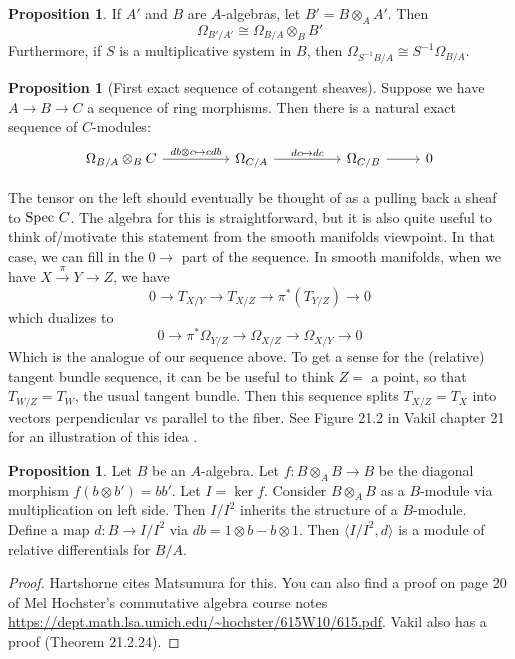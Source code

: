 \documentclass[10pt,reqno]{amsart}
\theoremstyle{definition}
\newtheorem{proposition}[theorem]{Proposition}
\theoremstyle{remark}
\numberwithin{equation}{section}
\numberwithin{theorem}{section}
\newcommand*{\red}{\textcolor{red}}
\newcommand{\spec}{\textup{Spec }}
\begin{document}
\begin{proposition}\label{prop:differentials-base-change} If $A'$ and $B$ are $A$-algebras, let $B' = B \otimes_A A'$. Then 
\[\Omega_{B'/A'} \cong \Omega_{B/A} \otimes_B B'\]
Furthermore, if $S$ is a multiplicative system in $B$, then $\Omega_{S^{-1}B/A} \cong S^{-1}\Omega_{B/A}$.
\end{proposition}


\begin{proposition}[First exact sequence of cotangent sheaves]\label{prop:differentials-two-maps-seq} Suppose we have $A \to B \to C$ a sequence of ring morphisms. Then there is a natural exact sequence of $C$-modules:
\[\begin{tikzcd}
\Omega_{B/A} \otimes_B C \arrow[rr," db \otimes c  \mapsto cdb"] & & \Omega_{C/A} \arrow[rr,"dc \mapsto dc"]& &\Omega_{C/B} \arrow[r]& 0
\end{tikzcd}\]
\end{proposition}

The tensor on the left should eventually be thought of as a pulling back a sheaf to $\spec C$. The algebra for this is straightforward, but it is also quite useful to think of/motivate this statement from the smooth manifolds viewpoint. In that case, we can fill in the $0 \to $ part of the sequence. In smooth manifolds, when we have $X \stackrel{\pi}{\to} Y \to Z$, we have
\[0 \to T_{X/Y} \to T_{X/Z} \to \pi^*(T_{Y/Z}) \to 0\]
which dualizes to
\[0 \to \pi^*\Omega_{Y/Z} \to \Omega_{X/Z} \to \Omega_{X/Y} \to 0\]
Which is the analogue of our sequence above. To get a sense for the (relative) tangent bundle sequence, it can be be useful to think $Z =$ a point, so that $T_{W/Z} = T_W$, the usual tangent bundle. Then this sequence splits $T_{X/Z} = T_X$ into vectors perpendicular vs parallel to the fiber. See Figure 21.2 in Vakil chapter 21 for an illustration of this idea .


\begin{proposition}\label{prop:diagonal-kernel}
Let $B$ be an $A$-algebra. Let $f: B \otimes_A B \to B$ be the diagonal morphism $f(b \otimes b') = bb'$. Let $I = \ker f$. Consider $B \otimes_A B$ as a $B$-module via multiplication on left side. Then $I/I^2$ inherits the structure of a $B$-module. 
\\

Define a map $d: B \to I/I^2$ via $db = 1 \otimes b - b \otimes 1$. Then $\langle I/I^2, d\rangle$ is a module of relative differentials for $B/A$.
\end{proposition}
\begin{proof}
Hartshorne cites Matsumura for this. You can also find a proof on page 20 of Mel Hochster's commutative algebra course notes \url{https://dept.math.lsa.umich.edu/~hochster/615W10/615.pdf}. Vakil also has a proof (Theorem 21.2.24).
\end{proof}
\end{document}
